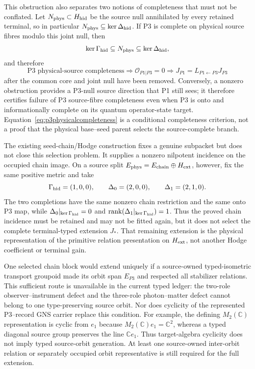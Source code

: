 \documentclass[11pt]{article}
\begin{document}
This obstruction also separates two notions of completeness that must not be
conflated.  Let $N_{\rm phys}\subset H_{\rm hid}$ be the source null
annihilated by every retained terminal, so in particular
$N_{\rm phys}\subseteq\ker\Delta_{\rm hid}$.  If P3 is complete on physical
source fibres modulo this joint null, then
\begin{equation}
\ker\Gamma_{\rm hid}\subseteq N_{\rm phys}
\subseteq\ker\Delta_{\rm hid},
\end{equation}
and therefore
\begin{equation}
\boxed{
\text{P3 physical-source completeness}
\Longrightarrow \mathcal O_{P1|P3}=0
\Longrightarrow J_{P1}=L_{P1\leftarrow P3}J_{P3}}
\label{eq:p3physicalcompleteness}
\end{equation}
after the common core and joint null have been removed.  Conversely, a
nonzero obstruction provides a P3-null source direction that P1 still sees;
it therefore certifies failure of P3 source-fibre completeness even when P3
is onto and informationally complete on its quantum operator-state target.
Equation~\eqref{eq:p3physicalcompleteness} is a conditional completeness
criterion, not a proof that the physical base--seed parent selects the
source-complete branch.

The existing seed-chain/Hodge construction fixes a genuine subpacket but does
not close this selection problem.  It supplies a nonzero nilpotent incidence
on the occupied chain image.  On a source split
$E_{\rm phys}=E_{\rm chain}\oplus H_{\rm ext}$, however, fix the same positive
metric and take
\begin{equation}
\Gamma_{\rm hid}=(1,0,0),\qquad
\Delta_0=(2,0,0),\qquad
\Delta_1=(2,1,0).
\label{eq:seedchainextensions}
\end{equation}
The two completions have the same nonzero chain restriction and the same onto
P3 map, while
$\Delta_0|_{\ker\Gamma_{\rm hid}}=0$ and
$\operatorname{rank}(\Delta_1|_{\ker\Gamma_{\rm hid}})=1$.  Thus the proved
chain incidence must be retained and may not be fitted again, but it does not
select the complete terminal-typed extension $J_*$.  That remaining extension
is the physical representation of the primitive relation presentation on
$H_{\rm ext}$, not another Hodge coefficient or terminal gain.

One selected chain block would extend uniquely if a source-owned
typed-isometric transport groupoid made its orbit span $E_{P3}$ and respected
all stabilizer relations.  This sufficient route is unavailable in the
current typed ledger: the two-role observer--instrument defect and the
three-role photon--matter defect cannot belong to one type-preserving source
orbit.  Nor does cyclicity of the represented P3--record GNS carrier replace
this condition.  For example, the defining $M_2(\mathbb C)$ representation
is cyclic from $e_1$ because $M_2(\mathbb C)e_1=\mathbb C^2$, whereas a typed
diagonal source group preserves the line $\mathbb C e_1$.  Thus target-algebra
cyclicity does not imply typed source-orbit generation.  At least one
source-owned inter-orbit relation or separately occupied orbit representative
is still required for the full extension.
\end{document}
